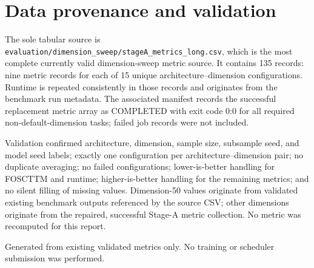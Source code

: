 \documentclass[10pt]{article}
\begin{document}
\section{Data provenance and validation}
The sole tabular source is \texttt{evaluation/dimension\_sweep/stageA\_metrics\_long.csv}, which is the most complete currently valid dimension-sweep metric source. It contains 135 records: nine metric records for each of 15 unique architecture--dimension configurations. Runtime is repeated consistently in those records and originates from the benchmark run metadata. The associated manifest records the successful replacement metric array as COMPLETED with exit code 0:0 for all required non-default-dimension tasks; failed job records were not included.

Validation confirmed architecture, dimension, sample size, subsample seed, and model seed labels; exactly one configuration per architecture--dimension pair; no duplicate averaging; no failed configurations; lower-is-better handling for FOSCTTM and runtime; higher-is-better handling for the remaining metrics; and no silent filling of missing values. Dimension-50 values originate from validated existing benchmark outputs referenced by the source CSV; other dimensions originate from the repaired, successful Stage-A metric collection. No metric was recomputed for this report.

\vfill
\footnotesize Generated from existing validated metrics only. No training or scheduler submission was performed.
\end{document}
